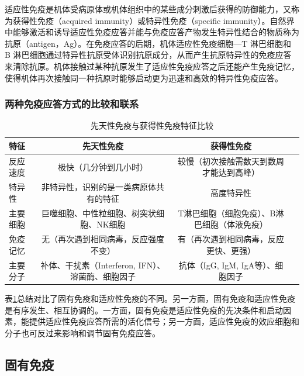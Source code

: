 \documentclass[9pt,a4paper,twoside]{rho-class/rho}
\begin{document}
        适应性免疫是机体受病原体或机体组织中的某些成分刺激后获得的防御能力，又称为获得性免疫（acquired immunity）或特异性免疫（specific immunity）。自然界中能够激活和诱导适应性免疫应答并能与免疫应答产物发生特异性结合的物质称为抗原（antigen，Ag）。在免疫应答的后期，机体适应性免疫细胞—T 淋巴细胞和 B 淋巴细胞通过特异性抗原受体识别抗原成分，从而产生抗原特异性的免疫应答来清除抗原。机体接触过某种抗原发生了适应性免疫应答之后还能产生免疫记忆，使得机体再次接触同一种抗原时能够启动更为迅速和高效的特异性免疫应答。

        \subsubsection{两种免疫应答方式的比较和联系}

        \begin{table}[H]
            \RaggedRight
            \caption{先天性免疫与获得性免疫特征比较}
            \label{tab:compare_between_two_immune_response}
                \begin{tabular}{lccp{12.2cm}}
                    \toprule
                    \textbf{特征} & \textbf{先天性免疫} & \textbf{获得性免疫} \\ 
                    \midrule
                    反应速度 & 极快（几分钟到几小时） & 较慢（初次接触需数天到数周才能达到高峰） \\
                    特异性 & 非特异性，识别的是一类病原体共有的特征 & 高度特异性 \\
                    主要细胞 & 巨噬细胞、中性粒细胞、树突状细胞、NK细胞 & T淋巴细胞（细胞免疫）、B淋巴细胞（体液免疫） \\
                    免疫记忆 & 无（再次遇到相同病毒，反应强度不变） & 有（再次遇到相同病毒，反应更快、更强） \\
                    主要分子 & 补体、干扰素（Interferon, IFN）、溶菌酶、细胞因子 & 抗体（IgG, IgM, IgA等）、细胞因子 \\
                \end{tabular}
        \end{table}

        表\ref{tab:compare_between_two_immune_response}总结对比了固有免疫和适应性免疫的不同。另一方面，固有免疫和适应性免疫是有序发生、相互协调的。一方面，固有免疫是适应性免疫的先决条件和启动因素，能提供适应性免疫应答所需的活化信号；另一方面，适应性免疫的效应细胞和分子也可反过来影响和调节固有免疫应答。

\subsection{固有免疫}
\end{document}
